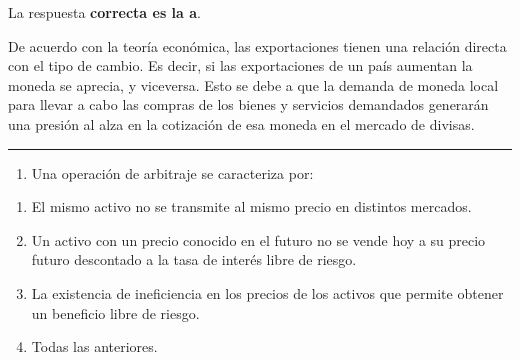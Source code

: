 \documentclass[
  letterpaper,
  DIV=11,
  numbers=noendperiod]{scrreprt}
\providecommand{\tightlist}{%
  \setlength{\itemsep}{0pt}\setlength{\parskip}{0pt}}\usepackage{longtable,booktabs,array}
\begin{document}
\begin{tcolorbox}[enhanced jigsaw, left=2mm, opacityback=0, colback=white, breakable, arc=.35mm, bottomrule=.15mm, rightrule=.15mm, toprule=.15mm, leftrule=.75mm, colframe=quarto-callout-tip-color-frame]
\begin{minipage}[t]{5.5mm}
\textcolor{quarto-callout-tip-color}{\faLightbulb}
\end{minipage}%
\begin{minipage}[t]{\textwidth - 5.5mm}

La respuesta \textbf{correcta es la a}.

De acuerdo con la teoría económica, las exportaciones tienen una
relación directa con el tipo de cambio. Es decir, si las exportaciones
de un país aumentan la moneda se aprecia, y viceversa. Esto se debe a
que la demanda de moneda local para llevar a cabo las compras de los
bienes y servicios demandados generarán una presión al alza en la
cotización de esa moneda en el mercado de divisas.

\end{minipage}%
\end{tcolorbox}

\begin{center}\rule{0.5\linewidth}{0.5pt}\end{center}

\begin{enumerate}
\def\labelenumi{\arabic{enumi}.}
\setcounter{enumi}{11}
\tightlist
\item
  Una operación de arbitraje se caracteriza por:
\end{enumerate}

\begin{enumerate}
\def\labelenumi{\alph{enumi})}
\item
  El mismo activo no se transmite al mismo precio en distintos mercados.
\item
  Un activo con un precio conocido en el futuro no se vende hoy a su
  precio futuro descontado a la tasa de interés libre de riesgo.
\item
  La existencia de ineficiencia en los precios de los activos que
  permite obtener un beneficio libre de riesgo.
\item
  Todas las anteriores.
\end{enumerate}
\end{document}
